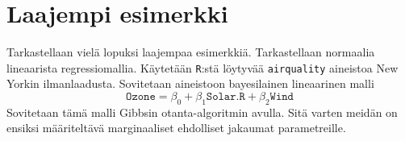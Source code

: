 \chapter{Laajempi esimerkki}\label{esimerkki}

Tarkastellaan vielä lopuksi laajempaa esimerkkiä. Tarkastellaan normaalia lineaarista regressiomallia. Käytetään \texttt{R}:stä löytyvää \texttt{airquality} aineistoa New Yorkin ilmanlaadusta. Sovitetaan aineistoon bayesilainen lineaarinen malli
\begin{equation}
	\texttt{Ozone} = \beta_0 + \beta_1\texttt{Solar.R} + \beta_2\texttt{Wind}
\end{equation}
 Sovitetaan tämä malli Gibbsin otanta-algoritmin avulla. Sitä varten meidän on ensiksi määriteltävä marginaaliset ehdolliset jakaumat parametreille.

